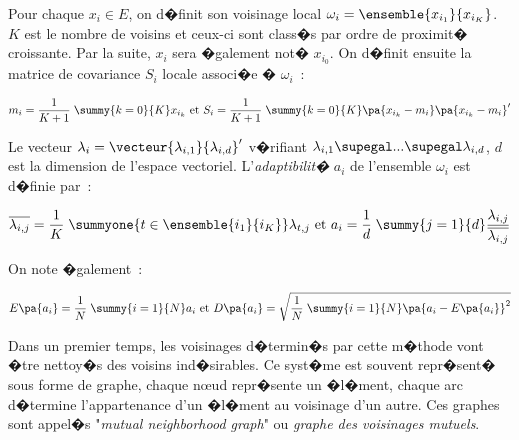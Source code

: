 Pour chaque $x_i \in E$, on d�finit son voisinage local $\omega_i = \ensemble{x_{i_1}}{x_{i_K}}$. $K$ est le nombre de voisins et ceux-ci sont class�s par ordre de proximit� croissante. Par la suite, $x_i$ sera �galement not� $x_{i_0}$. On d�finit ensuite la matrice de covariance $S_i$ locale associ�e � $\omega_i$~:

            \begin{eqnarray}
            m_i = \frac{1}{K+1} \; \summy{k=0}{K} x_{i_k} \text{ et } 
            S_i = \frac{1}{K+1} \; \summy{k=0}{K} \pa{x_{i_k} - m_i } \pa{x_{i_k} - m_i }'
            \label{classif_zhang_eq1}
            \end{eqnarray}

Le vecteur $\lambda_i = \vecteur{\lambda_{i,1}}{\lambda_{i,d}}'$ v�rifiant $\lambda_{i,1} \supegal ... \supegal \lambda_{i,d}$, $d$ est la dimension de l'espace vectoriel. L'\emph{adaptibilit�} $a_i$  de l'ensemble $\omega_i$ est d�finie par~: 

            \begin{eqnarray}
            \overline{\lambda_{i,j}}  = \frac{1}{K} \; \summyone{t \in \ensemble{i_1}{i_K} } \lambda_{t,j} \text{ et }
            a_i = \frac{1}{d} \; \summy{j=1}{d} \frac{ \lambda_{i,j} } { \overline { \lambda_{i,j}} }
            \label{classif_zhang_eq2}
            \end{eqnarray}
            
On note �galement~:

            \begin{eqnarray}
            E\pa{a_i} = \frac{1}{N} \; \summy{i=1}{N} a_i \text{ et } 
            D\pa{a_i} = \sqrt{ \frac{1}{N} \; \summy{i=1}{N} \pa{ a_i - E\pa{a_i} }^2 }
            \label{classif_zhang_eq3}
            \end{eqnarray}
            
            
Dans un premier temps, les voisinages d�termin�s par cette m�thode vont �tre nettoy�s des voisins ind�sirables. Ce syst�me est souvent repr�sent� sous forme de graphe, chaque n\oe ud repr�sente un �l�ment, chaque arc d�termine l'appartenance d'un �l�ment au voisinage d'un autre. Ces graphes sont appel�s "\emph{mutual neighborhood graph}" ou \emph{graphe des voisinages mutuels}.


